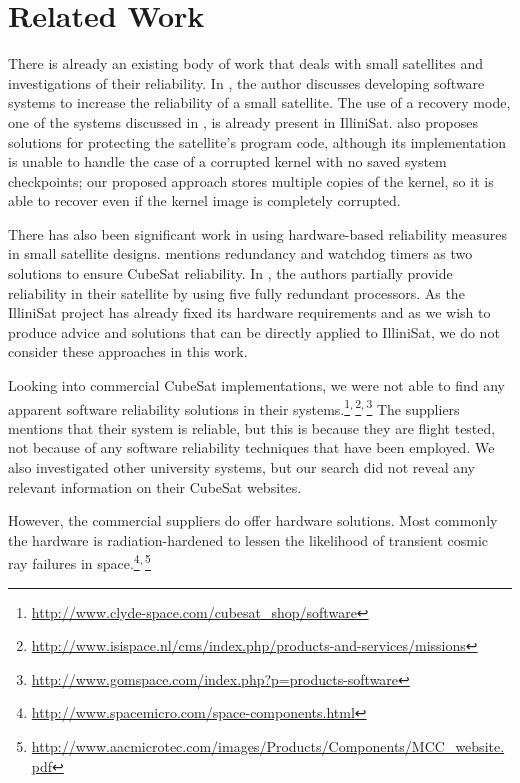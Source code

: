 \section{Related Work}\label{sec:related_work}
There is already an existing body of work that deals with small satellites and
investigations of their reliability.  In \cite{odegaard2013error}, the author
discusses developing software systems to increase the reliability of a small satellite.
The use of a recovery mode, one of the systems discussed in
\cite{odegaard2013error}, is already present in IlliniSat.
\cite{odegaard2013error} also proposes solutions for protecting the satellite's
program code, although its implementation is unable to handle the case of a
corrupted kernel with no saved system checkpoints; our proposed approach stores
multiple copies of the kernel, so it is able to recover even if the kernel image
is completely corrupted.

There has also been significant work in using hardware-based reliability measures in small satellite designs.  \cite{toorian2008cubesat} mentions redundancy and watchdog timers as two solutions to ensure CubeSat reliability.  In \cite{passerone2008design}, the authors partially provide reliability in their satellite by using five fully redundant processors.   As the IlliniSat project has already fixed its hardware requirements and as we wish to produce advice and solutions that can be directly applied to IlliniSat, we do not consider these approaches in this work.

Looking into commercial CubeSat implementations, we were not able to 
find any apparent software reliability solutions in their systems.\footnote{\url{http://www.clyde-space.com/cubesat_shop/software}}$^\textnormal{,}$\footnote{\url{http://www.isispace.nl/cms/index.php/products-and-services/missions}}$^\textnormal{,}$\footnote{\url{http://www.gomspace.com/index.php?p=products-software}}
The suppliers mentions that their system is reliable, but this is because
they are flight tested, not because of any software reliability techniques that
have been employed.  We also investigated other university systems, but our
search did not reveal any relevant information on their CubeSat websites.

However, the commercial suppliers do offer hardware solutions. Most commonly
the hardware is radiation-hardened to lessen the likelihood of transient cosmic ray
failures in space.\footnote{\url{http://www.spacemicro.com/space-components.html}}$^\textnormal{,}$\footnote{\url{http://www.aacmicrotec.com/images/Products/Components/MCC_website.pdf}}




